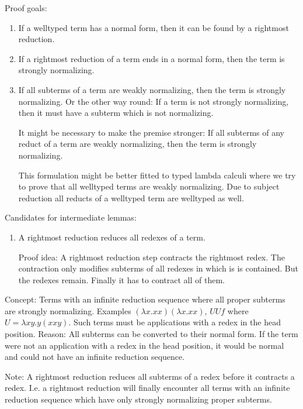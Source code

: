Proof goals:
\begin{enumerate}
    \item If a welltyped term has a normal form, then it can be found
        by a rightmost reduction.

    \item If a rightmost reduction of a term ends in a normal form, then
        the term is strongly normalizing.

    \item  If all subterms of a term are weakly normalizing, then the term
        is strongly normalizing. Or the other way round: If a term is not
        strongly normalizing, then it must have a subterm which is not
        normalizing.

        It might be necessary to make the premise stronger: If all subterms of
        any reduct of a term are weakly normalizing, then the term is strongly
        normalizing.

        This formulation might be better fitted to typed lambda calculi
        where we try to prove that all welltyped terms are weakly normalizing.
        Due to subject reduction all reducts of a welltyped term are welltyped
        as well.
\end{enumerate}

Candidates for intermediate lemmas:
\begin{enumerate}
    \item A rightmost reduction reduces all redexes of a term.

        Proof idea: A rightmost reduction step contracts the rightmost redex.
        The contraction only modifies subterms of all redexes
        in which is is contained. But the redexes remain. Finally it has to
        contract all of them.
\end{enumerate}


Concept: Terms with an infinite reduction sequence where all proper subterms are
strongly normalizing. Examples $(\lambda x. x x)(\lambda x. x x)$, $U U f$ where
$U = \lambda x y. y (x x y)$. Such terms must be applications with a redex in
the head position. Reason: All subterms can be converted to their normal form.
If the term were not an application with  a redex in the head position, it would
be normal and could not have an infinite reduction sequence.

Note: A rightmost reduction reduces all subterms of a redex before it contracts
a redex. I.e. a rightmost reduction will finally encounter all terms with an
infinite reduction sequence which have only strongly normalizing proper
subterms.

